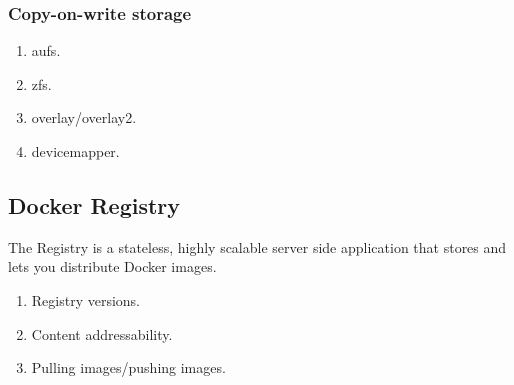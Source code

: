 \subsubsection{Copy-on-write storage}



\begin{enumerate}
	\item aufs.
	\item zfs.
	\item overlay/overlay2.
	\item devicemapper.
\end{enumerate}





\subsection{Docker Registry}

The Registry is a stateless, highly scalable server side application that stores and lets you distribute Docker images.

\begin{enumerate}
	\item Registry versions.
	\item Content addressability.
	\item Pulling images/pushing images.
\end{enumerate}

